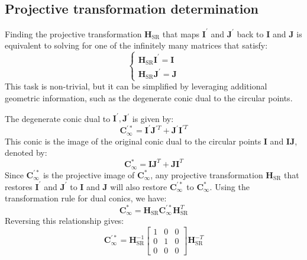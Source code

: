\subsection{Projective transformation determination}
Finding the projective transformation $\mathbf{H}_\text{SR}$ that maps $\mathbf{I}^\prime$ and $\mathbf{J}^\prime$ back to $\mathbf{I}$ and $\mathbf{J}$ is equivalent to solving for one of the infinitely many matrices that satisfy:
\[\begin{cases}
    \mathbf{H}_\text{SR}\mathbf{I}^\prime=\mathbf{I} \\
    \mathbf{H}_\text{SR}\mathbf{J}^\prime=\mathbf{J}
\end{cases}\]
This task is non-trivial, but it can be simplified by leveraging additional geometric information, such as the degenerate conic dual to the circular points.

The degenerate conic dual to $\mathbf{I}^\prime,\mathbf{J}^\prime$ is given by:
\[\mathbf{C}_{\infty}^{\prime\ast}=\mathbf{I}^\prime \mathbf{J}^{\prime T}+\mathbf{J}^\prime \mathbf{I}^{\prime T}\]
This conic is the image of the original conic dual to the circular points $\mathbf{I}$ and $\mathbf{IJ}$, denoted by:
\[\mathbf{C}_{\infty}^\ast=\mathbf{IJ}^{T}+\mathbf{JI}^{T}\]
Since $\mathbf{C}_{\infty}^{\prime\ast}$ is the projective image of $\mathbf{C}_\infty^\ast$, any projective transformation $\mathbf{H}_\text{SR}$ that restores $\mathbf{I}^\prime$ and $\mathbf{J}^\prime$ to $\mathbf{I}$ and $\mathbf{J}$ will also restore $\mathbf{C}_{\infty}^{\prime\ast}$ to $\mathbf{C}_{\infty}^\ast$. 
Using the transformation rule for dual conics, we have:
\[\mathbf{C}^\ast_{\infty}=\mathbf{H}_\text{SR}\mathbf{C}^{\prime\ast}_{\infty}\mathbf{H}_\text{SR}^T\]
Reversing this relationship gives:
\[\mathbf{C}_{\infty}^{\prime\ast}=\mathbf{H}_\text{SR}^{-1} \begin{bmatrix} 1 & 0 & 0 \\ 0 & 1 & 0 \\ 0 & 0 & 0 \end{bmatrix} \mathbf{H}_\text{SR}^{-T}\]

